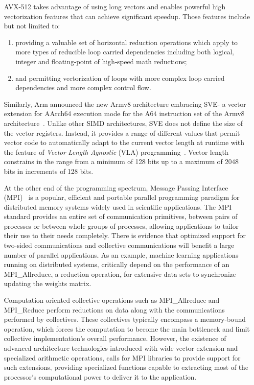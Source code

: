 \documentclass[5p,times,twocolumn]{elsarticle}
\newcommand{\mpi}[0]{\textsc{MPI}\xspace}
\newcommand{\arm}[0]{Arm\xspace}
\newcommand{\sve}[0]{\textsc{SVE}\xspace}
\begin{document}
AVX-512 takes advantage of using long vectors and enables powerful high
vectorization features that can achieve significant speedup. Those features
include but not limited to:
\begin{enumerate}
  \item providing a valuable set of horizontal reduction operations which apply to more
  types of reducible loop carried dependencies including both logical, integer
  and floating-point of high-speed math reductions;
  \item and permitting vectorization of loops with more complex loop carried dependencies and more complex control flow.
\end{enumerate}

Similarly, \arm announced the new Armv8 architecture embracing \sve - a vector extension for AArch64
execution mode for the A64 instruction set of the
Armv8 architecture~\cite{arm-v8-ref, ARMv8-Architecture}.
Unlike other SIMD architectures, \sve does not define the size of
the vector registers. Instead, it provides a range of different values that permit vector
code to automatically adapt to the current vector length at runtime with the
feature of \emph{Vector Length Agnostic} (VLA) programming~\cite{Advanced-SIMD,vla-stencil}.
Vector length constrains in the range from a minimum of 128 bits up to
a maximum of 2048 bits in increments of 128 bits.

At the other end of the programming spectrum, Message Passing Interface
(\mpi)~\cite{mpi-forum} is a popular, efficient and portable parallel programming
paradigm for distributed memory systems widely used in scientific applications.
The MPI standard provides an entire set of communication primitives, between pairs
of processes or between whole groups of processes,
allowing applications to tailor their use to their needs completely.
There is evidence that optimized support for two-sided communications and
collective communications will benefit a large number of parallel applications. As an example,
machine learning applications running on distributed systems,
critically depend on the performance of an MPI\_Allreduce, a reduction operation,
for extensive data sets to synchronize updating the weights matrix.

Computation-oriented collective operations such as MPI\_Allreduce and MPI\_Reduce perform reductions on
data along with the communications performed by collectives.
These collectives typically encompass a memory-bound operation, which forces
the computation to become the main bottleneck and limit collective implementation's overall performance.
However, the existence of advanced architecture technologies introduced
with wide vector extension and specialized arithmetic operations, calls for
MPI libraries to provide support for such extensions, providing specialized functions
capable to extracting most of the processor's computational power to deliver it to the application.
\end{document}
